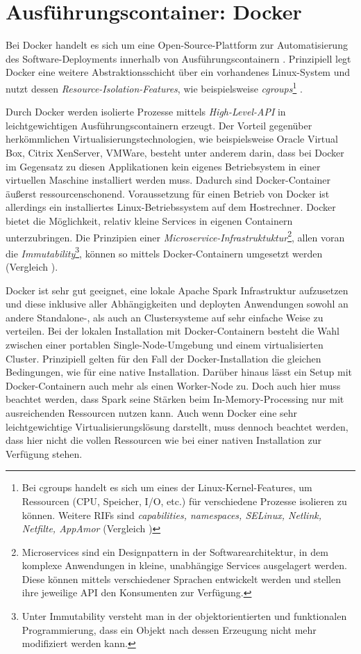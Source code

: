 \newpage 


\section{Ausführungscontainer: Docker}
\label{section:docker}

Bei Docker handelt es sich um eine Open-Source-Plattform zur Automatisierung des Software-Deployments innerhalb von Ausführungscontainern . Prinzipiell legt Docker eine weitere Abstraktionsschicht über ein vorhandenes Linux-System und nutzt dessen \textit{Resource-Isolation-Features}, wie beispielsweise \textit{cgroups}\footnote{Bei cgroups handelt es sich um eines der Linux-Kernel-Features, um Ressourcen (CPU, Speicher, I/O, etc.) für verschiedene Prozesse isolieren zu können. Weitere RIFs sind \textit{capabilities, namespaces, SELinux, Netlink, Netfilte, AppAmor} (Vergleich )} . 

Durch Docker werden isolierte Prozesse mittels \textit{High-Level-API} in leichtgewichtigen Ausführungscontainern erzeugt. Der Vorteil gegenüber herkömmlichen Virtualisierungstechnologien, wie beispielsweise Oracle Virtual Box, Citrix XenServer, VMWare, besteht unter anderem darin, dass bei Docker im Gegensatz zu diesen Applikationen kein eigenes Betriebsystem in einer virtuellen Maschine installiert werden muss. Dadurch sind Docker-Container äußerst ressourcenschonend. Voraussetzung für einen Betrieb von Docker ist allerdings ein installiertes Linux-Betriebssystem auf dem Hostrechner. Docker bietet die Möglichkeit, relativ kleine Services in eigenen Containern unterzubringen. Die Prinzipien einer \textit{Microservice-Infrastruktuktur}\footnote{Microservices sind ein Designpattern in der Softwarearchitektur, in dem komplexe Anwendungen in kleine, unabhängige Services ausgelagert werden. Diese können mittels verschiedener Sprachen entwickelt werden und stellen ihre jeweilige API den Konsumenten zur Verfügung.}, allen voran die \textit{Immutability}\footnote{Unter Immutability versteht man in der objektorientierten und funktionalen Programmierung, dass ein Objekt nach dessen Erzeugung nicht mehr modifiziert werden kann.}, können so mittels Docker-Containern umgesetzt werden  (Vergleich ). 

Docker ist sehr gut geeignet, eine lokale Apache Spark Infrastruktur aufzusetzen und diese inklusive aller Abhängigkeiten und deployten Anwendungen sowohl an andere Standalone-, als auch an Clustersysteme auf sehr einfache Weise zu verteilen. Bei der lokalen Installation mit Docker-Containern besteht die Wahl zwischen einer portablen Single-Node-Umgebung und einem virtualisierten Cluster. Prinzipiell gelten für den Fall der Docker-Installation die gleichen Bedingungen, wie für eine native Installation. Darüber hinaus lässt ein Setup mit Docker-Containern auch mehr als einen Worker-Node zu. Doch auch hier muss beachtet werden, dass Spark seine Stärken beim In-Memory-Processing nur mit ausreichenden Ressourcen nutzen kann. Auch wenn Docker eine sehr leichtgewichtige Virtualisierungslösung darstellt, muss dennoch beachtet werden, dass hier nicht die vollen Ressourcen wie bei einer nativen Installation zur Verfügung stehen. 

